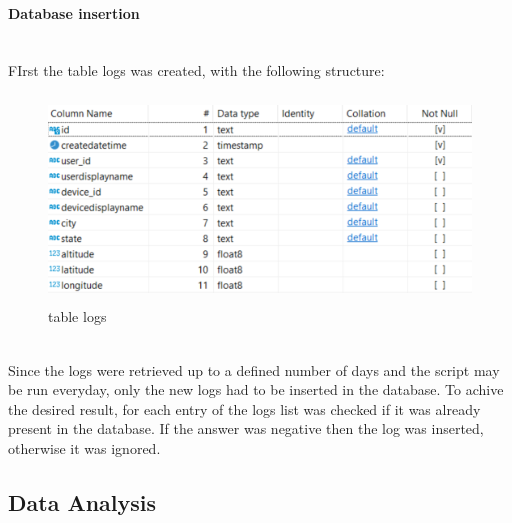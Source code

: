 \documentclass[12pt, a4paper, oneside]{article}
\begin{document}
\paragraph{Database insertion} ~\\
FIrst the table logs was created, with the following structure:
\begin{figure}[h]
    \centering
    \includegraphics[width=13cm, height=5.5cm]{table-logs.png}
    \caption{table logs}
\end{figure}\\
Since the logs were retrieved up to a defined number of days and the script may be run everyday, only the new logs had to be inserted in the database. To achive the desired result, for each entry of the logs
list was checked if it was already present in the database. If the answer was negative then the log was inserted, otherwise it was ignored.

\subsection{Data Analysis}
\end{document}

